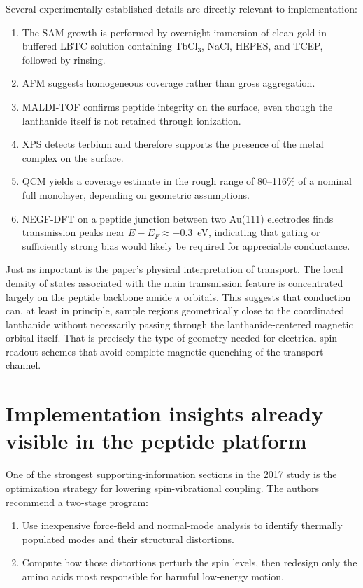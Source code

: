 \documentclass[11pt]{report}
\newcommand{\lbtc}{LBTC}
\newcommand{\au}{Au(111)}
\theoremstyle{definition}
\begin{document}
Several experimentally established details are directly relevant to implementation:

\begin{enumerate}[leftmargin=2em]
\item The SAM growth is performed by overnight immersion of clean gold in buffered \lbtc{} solution containing TbCl$_3$, NaCl, HEPES, and TCEP, followed by rinsing.
\item AFM suggests homogeneous coverage rather than gross aggregation.
\item MALDI-TOF confirms peptide integrity on the surface, even though the lanthanide itself is not retained through ionization.
\item XPS detects terbium and therefore supports the presence of the metal complex on the surface.
\item QCM yields a coverage estimate in the rough range of 80--116\% of a nominal full monolayer, depending on geometric assumptions.
\item NEGF-DFT on a peptide junction between two \au{} electrodes finds transmission peaks near $E-E_F \approx -0.3$~eV, indicating that gating or sufficiently strong bias would likely be required for appreciable conductance.
\end{enumerate}

Just as important is the paper's physical interpretation of transport. The local density of states associated with the main transmission feature is concentrated largely on the peptide backbone amide $\pi$ orbitals. This suggests that conduction can, at least in principle, sample regions geometrically close to the coordinated lanthanide without necessarily passing through the lanthanide-centered magnetic orbital itself. That is precisely the type of geometry needed for electrical spin readout schemes that avoid complete magnetic-quenching of the transport channel.

\section{Implementation insights already visible in the peptide platform}
One of the strongest supporting-information sections in the 2017 study is the optimization strategy for lowering spin-vibrational coupling. The authors recommend a two-stage program:

\begin{enumerate}[leftmargin=2em]
\item Use inexpensive force-field and normal-mode analysis to identify thermally populated modes and their structural distortions.
\item Compute how those distortions perturb the spin levels, then redesign only the amino acids most responsible for harmful low-energy motion.
\end{enumerate}
\end{document}
